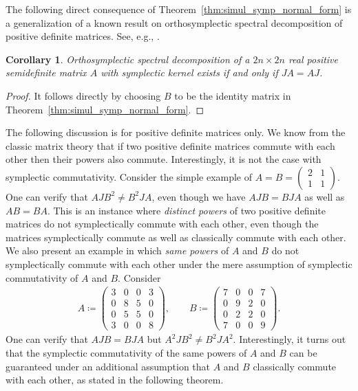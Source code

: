 \documentclass[preprint,12pt]{elsarticle}
\newtheorem{corollary}[theorem]{Corollary}
\begin{document}
    The following direct consequence of Theorem~\ref{thm:simul_symp_normal_form} is a generalization of a known result on {orthosymplectic spectral decomposition} of positive definite matrices.
    See, e.g., \cite[Proposition~3.7]{son2021symplectic}.
    \begin{corollary}\label{cor:orthosymplectic-diagonalization-williamson}
        Orthosymplectic spectral decomposition of a $2n \times 2n$ real positive semidefinite matrix $A$ with symplectic kernel exists if and only if $JA=AJ$.
    \end{corollary}
    \begin{proof}
        It follows directly by choosing $B$ to be the identity matrix in Theorem~\ref{thm:simul_symp_normal_form}.
    \end{proof}

    The following discussion is for positive definite matrices only.
    We know from the classic matrix theory that if two positive definite matrices commute with each other then their powers also commute.
    Interestingly, it is not the case with symplectic commutativity. 
    Consider the simple example of $A=B=\left(\begin{smallmatrix} 2 & 1 \\ 1 & 1  \end{smallmatrix}\right)$.
    One can verify that $AJB^2 \neq B^2 JA$, even though we have 
    $AJB=BJA$ as well as $AB=BA$.
    This is an instance where \emph{distinct powers} of two positive definite matrices do not symplectically commute with each other, even though the matrices symplectically commute as well as classically commute with each other.
    We also present an example in which \emph{same powers} of $A$ and $B$ do not symplectically commute with each other under the mere assumption of symplectic commutativity of $A$ and $B$.
    Consider
    \begin{align}
        A\coloneqq
        \begin{pmatrix}  
        3&0&0&3  \\ 
        0&8&5&0 \\
        0&5&5&0 \\
        3&0&0&8 
        \end{pmatrix}, \qquad
        B\coloneqq
        \begin{pmatrix}  
        7&0&0&7  \\ 
        0&9&2&0 \\
        0&2&2&0 \\
        7&0&0&9 
        \end{pmatrix}.   
    \end{align}
    One can verify that $AJB=BJA$ but $A^2JB^2 \neq B^2 JA^2$.
    Interestingly, it turns out that the symplectic commutativity of the same powers of $A$ and $B$ can be guaranteed under an additional assumption that $A$ and $B$ classically commute with each other, as stated in the following theorem.
\end{document}
